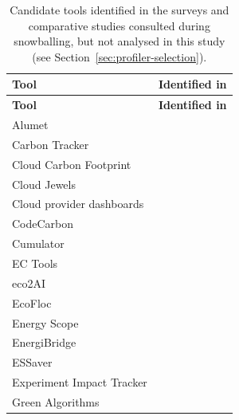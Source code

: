 \documentclass[
  acmsmall,
  screen,
  review,
  xcolor={dvipsnames,usenames}
]{acmart}
\begin{document}
{\footnotesize
\setlength{\tabcolsep}{3pt}
\begin{longtable}{@{}>{\raggedright\arraybackslash}p{5.5cm}>{\raggedright\arraybackslash}p{\dimexpr\linewidth-5.5cm-2\tabcolsep\relax}@{}}
\caption{Candidate tools identified in the surveys and comparative studies consulted during snowballing, but not analysed in this study (see Section~\ref{sec:profiler-selection}).}
\label{tab:not-analysed}\\
\toprule
\textbf{Tool} & \textbf{Identified in}\\
\midrule
\endfirsthead
\toprule
\textbf{Tool} & \textbf{Identified in}\\
\midrule
\endhead
\bottomrule
\endfoot
Alumet & \cite{woirhayeJouleProfilerPhasebased2026}\\
Carbon Tracker & \cite{jayExperimentalComparisonSoftwarebased2023,pathaniaCalculatingSoftwaresEnergy2025}\\
Cloud Carbon Footprint & \cite{pathaniaCalculatingSoftwaresEnergy2025}\\
Cloud Jewels & \cite{pathaniaCalculatingSoftwaresEnergy2025}\\
Cloud provider dashboards & \cite{pathaniaCalculatingSoftwaresEnergy2025}\\
CodeCarbon \cite{courtyMlco2CodecarbonV3322026,codeCarbon} & \cite{raffinDissectingSoftwarebasedMeasurement2025,jayExperimentalComparisonSoftwarebased2023,pathaniaCalculatingSoftwaresEnergy2025}\\
Cumulator & \cite{pathaniaCalculatingSoftwaresEnergy2025,jayExperimentalComparisonSoftwarebased2023}\\
EC Tools & \cite{jagroepProfilingEnergyProfilers2015}\\
eco2AI & \cite{pathaniaCalculatingSoftwaresEnergy2025}\\
EcoFloc & \cite{aneggiMeasuringSoftwareEnergy2026}\\
Energy Scope & \cite{jayExperimentalComparisonSoftwarebased2023}\\
EnergiBridge & \cite{aneggiMeasuringSoftwareEnergy2026}\\
ESSaver & \cite{jagroepProfilingEnergyProfilers2015}\\
Experiment Impact Tracker \cite{hendersonSystematicReportingEnergy2022,hendersonBreakendExperimentimpacttracker2026} & \cite{jayExperimentalComparisonSoftwarebased2023,pathaniaCalculatingSoftwaresEnergy2025}\\
Green Algorithms & \cite{jayExperimentalComparisonSoftwarebased2023,pathaniaCalculatingSoftwaresEnergy2025}\\

\end{longtable}}
\end{document}
